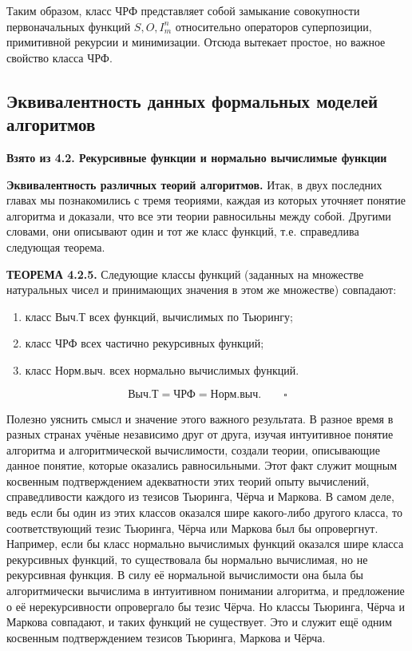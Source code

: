 \documentclass[a4paper,12pt]{article}
\begin{document}
Таким образом, класс ЧРФ представляет собой замыкание совокупности первоначальных функций \(S, O, I_m^n\) относительно операторов суперпозиции, примитивной рекурсии и минимизации. Отсюда вытекает простое, но важное свойство класса ЧРФ.

\subsection{Эквивалентность данных формальных моделей алгоритмов}

\textbf{Взято из 4.2. Рекурсивные функции и нормально вычислимые функции}

\textbf{Эквивалентность различных теорий алгоритмов.} Итак, в двух последних главах мы познакомились с тремя теориями, каждая из которых уточняет понятие алгоритма и доказали, что все эти теории равносильны между собой. Другими словами, они описывают один и тот же класс функций, т.е. справедлива следующая теорема.

\textbf{ТЕОРЕМА 4.2.5.} Следующие классы функций (заданных на множестве натуральных чисел и принимающих значения в этом же множестве) совпадают:
\begin{enumerate}
    \item[a)] класс \(\text{Выч.Т}\) всех функций, вычислимых по Тьюрингу;
    \item[б)] класс \(\text{ЧРФ}\) всех частично рекурсивных функций;
    \item[в)] класс \(\text{Норм.выч.}\) всех нормально вычислимых функций.
\end{enumerate}
\[
\text{Выч.Т} = \text{ЧРФ} = \text{Норм.выч.} \qquad \square
\]

Полезно уяснить смысл и значение этого важного результата. В разное время в разных странах учёные независимо друг от друга, изучая интуитивное понятие алгоритма и алгоритмической вычислимости, создали теории, описывающие данное понятие, которые оказались равносильными. Этот факт служит мощным косвенным подтверждением адекватности этих теорий опыту вычислений, справедливости каждого из тезисов Тьюринга, Чёрча и Маркова. В самом деле, ведь если бы один из этих классов оказался шире какого-либо другого класса, то соответствующий тезис Тьюринга, Чёрча или Маркова был бы опровергнут. Например, если бы класс нормально вычислимых функций оказался шире класса рекурсивных функций, то существовала бы нормально вычислимая, но не рекурсивная функция. В силу её нормальной вычислимости она была бы алгоритмически вычислима в интуитивном понимании алгоритма, и предложение о её нерекурсивности опровергало бы тезис Чёрча. Но классы Тьюринга, Чёрча и Маркова совпадают, и таких функций не существует. Это и служит ещё одним косвенным подтверждением тезисов Тьюринга, Маркова и Чёрча.
\end{document}
